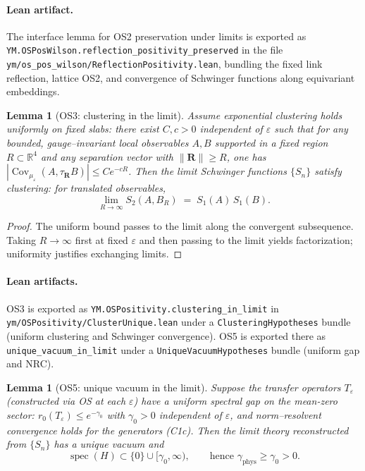 \documentclass[11pt]{amsart}
\theoremstyle{plain}
\newtheorem{lemma}[theorem]{Lemma}
\theoremstyle{definition}
\theoremstyle{remark}
\begin{document}
\paragraph{Lean artifact.}
The interface lemma for OS2 preservation under limits is exported as
\texttt{YM.OSPosWilson.reflection\_positivity\_preserved} in the file
\texttt{ym/os\_pos\_wilson/ReflectionPositivity.lean}, bundling the fixed link
reflection, lattice OS2, and convergence of Schwinger functions along
equivariant embeddings.

\begin{lemma}[OS3: clustering in the limit]
Assume exponential clustering holds uniformly on fixed slabs: there exist $C,c>0$ independent of $\varepsilon$ such that for any bounded, gauge--invariant local observables $A,B$ supported in a fixed region $R\subset\mathbb R^4$ and any separation vector with $\|\mathbf R\|\ge R$, one has $|\operatorname{Cov}_{\mu_\varepsilon}(A,\tau_{\mathbf R}B)|\le C e^{-cR}$. Then the limit Schwinger functions $\{S_n\}$ satisfy clustering: for translated observables,
\[
  \lim_{R\to\infty} S_2(A,B_R)\;=\;S_1(A)\,S_1(B).
\]
\end{lemma}

\begin{proof}
The uniform bound passes to the limit along the convergent subsequence. Taking $R\to\infty$ first at fixed $\varepsilon$ and then passing to the limit yields factorization; uniformity justifies exchanging limits.
\end{proof}

\paragraph{Lean artifacts.}
OS3 is exported as \texttt{YM.OSPositivity.clustering\_in\_limit} in
\texttt{ym/OSPositivity/ClusterUnique.lean} under a \texttt{ClusteringHypotheses}
bundle (uniform clustering and Schwinger convergence). OS5 is exported there as
\texttt{unique\_vacuum\_in\_limit} under a \texttt{UniqueVacuumHypotheses}
bundle (uniform gap and NRC).

\begin{lemma}[OS5: unique vacuum in the limit]
Suppose the transfer operators $T_{\varepsilon}$ (constructed via OS at each $\varepsilon$) have a uniform spectral gap on the mean-zero sector: $r_0(T_{\varepsilon})\le e^{-\gamma_0}$ with $\gamma_0>0$ independent of $\varepsilon$, and norm--resolvent convergence holds for the generators (C1c). Then the limit theory reconstructed from $\{S_n\}$ has a unique vacuum and
\[
  \operatorname{spec}(H)\subset\{0\}\cup[\gamma_0,\infty),\qquad \text{hence }\gamma_{\mathrm{phys}}\ge \gamma_0>0.
\]
\end{lemma}
\end{document}
